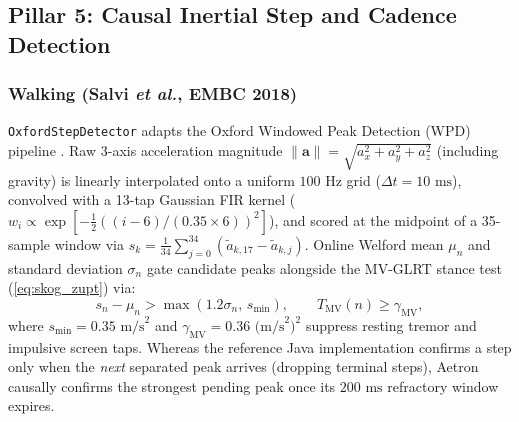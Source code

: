 \documentclass[journal]{IEEEtran}
\begin{document}
\subsection{Pillar 5: Causal Inertial Step and Cadence Detection}
\subsubsection{Walking (Salvi \emph{et al.}, EMBC 2018)}
\texttt{OxfordStepDetector} adapts the Oxford Windowed Peak Detection (WPD) pipeline \cite{salvi2018oxford}. Raw 3-axis acceleration magnitude $\|\mathbf{a}\| = \sqrt{a_x^2 + a_y^2 + a_z^2}$ (including gravity) is linearly interpolated onto a uniform $100\text{ Hz}$ grid ($\Delta t = 10\text{ ms}$), convolved with a 13-tap Gaussian FIR kernel ($w_i \propto \exp[-\frac{1}{2}((i-6)/(0.35\times 6))^2]$), and scored at the midpoint of a 35-sample window via $s_k = \frac{1}{34}\sum_{j=0}^{34}(\tilde{a}_{k,17} - \tilde{a}_{k,j})$. Online Welford mean $\mu_n$ and standard deviation $\sigma_n$ gate candidate peaks alongside the MV-GLRT stance test (\ref{eq:skog_zupt}) via:
\begin{equation}
  s_n - \mu_n > \max(1.2\sigma_n,\, s_{\min}), \qquad
  T_{\text{MV}}(n) \ge \gamma_{\text{MV}},
  \label{eq:oxford}
\end{equation}
where $s_{\min} = 0.35\text{ m/s}^2$ and $\gamma_{\text{MV}} = 0.36\text{ (m/s}^2)^2$ suppress resting tremor and impulsive screen taps. Whereas the reference Java implementation confirms a step only when the \emph{next} separated peak arrives (dropping terminal steps), Aetron causally confirms the strongest pending peak once its $200\text{ ms}$ refractory window expires.
\end{document}
